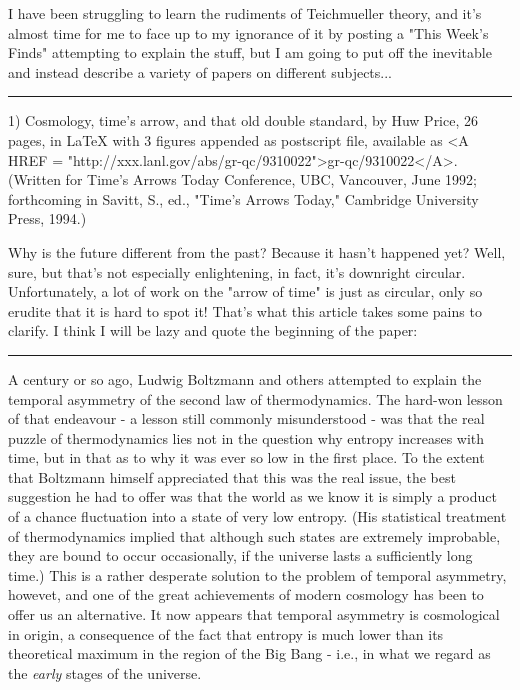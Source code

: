 

I have been struggling to learn the rudiments of Teichmueller 
theory, and it's almost time for me to face up to my ignorance of it by
posting a "This Week's Finds" attempting to explain the stuff, but I am
going to put off the inevitable and instead describe a variety of papers
on different subjects... 

\par\noindent\rule{\textwidth}{0.4pt}

1) Cosmology, time's arrow, and that old double standard, by Huw Price,
26 pages, in LaTeX with 3 figures appended as postscript file, available
as <A HREF = "http://xxx.lanl.gov/abs/gr-qc/9310022">gr-qc/9310022</A>.  (Written for Time's Arrows Today Conference, UBC,
Vancouver, June 1992; forthcoming in Savitt, S., ed., "Time's Arrows
Today," Cambridge University Press, 1994.)

Why is the future different from the past?  Because it hasn't
happened yet?  Well, sure, but that's not especially enlightening, in
fact, it's downright circular.  Unfortunately, a lot of work on the
"arrow of time" is just as circular, only so erudite that it is hard to
spot it!  That's what this article takes some pains to clarify.  I think
I will be lazy and quote the beginning of the paper:

\par\noindent\rule{\textwidth}{0.4pt}
A century or so ago, Ludwig Boltzmann and others attempted to explain
the temporal asymmetry of the second law of thermodynamics.  The
hard-won lesson of that endeavour - a lesson still commonly
misunderstood - was that the real puzzle of thermodynamics lies not in
the question why entropy increases with time, but in that as to why it
was ever so low in the first place.  To the extent that Boltzmann
himself appreciated that this was the real issue, the best suggestion he
had to offer was that the world as we know it is simply a product of a
chance fluctuation into a state of very low entropy.  (His statistical
treatment of thermodynamics implied that although such states are
extremely improbable, they are bound to occur occasionally, if the
universe lasts a sufficiently long time.) This is a rather desperate
solution to the problem of temporal asymmetry, howevet, and one of the
great achievements of modern cosmology has been to offer us an
alternative. It now appears that temporal asymmetry is cosmological in
origin, a consequence of the fact that entropy is much lower than its
theoretical maximum in the region of the Big Bang - i.e., in what we
regard as the \emph{early} stages of the universe.  

